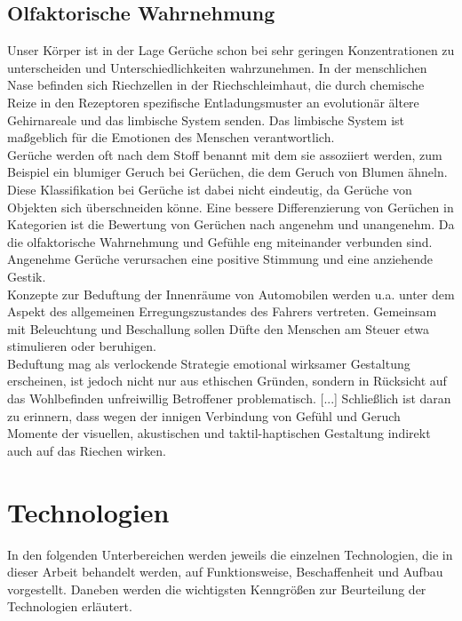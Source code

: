 \subsection{Olfaktorische Wahrnehmung}
Unser Körper ist in der Lage Gerüche schon bei sehr geringen Konzentrationen zu unterscheiden und Unterschiedlichkeiten wahrzunehmen. In der menschlichen Nase befinden sich Riechzellen in der Riechschleimhaut, die durch chemische Reize in den Rezeptoren spezifische Entladungsmuster an evolutionär ältere Gehirnareale und das limbische System senden. Das limbische System ist maßgeblich für die Emotionen des Menschen verantwortlich. \cite[Vgl. Seite 102]{Schonhammer.2013}\\
Gerüche werden oft nach dem Stoff benannt mit dem sie assoziiert werden, zum Beispiel ein blumiger Geruch bei Gerüchen, die dem Geruch von Blumen ähneln. Diese Klassifikation bei Gerüche ist dabei nicht eindeutig, da Gerüche von Objekten sich überschneiden könne. Eine bessere Differenzierung von Gerüchen in Kategorien ist die Bewertung von Gerüchen nach angenehm und unangenehm. Da die olfaktorische Wahrnehmung und Gefühle eng miteinander verbunden sind. Angenehme Gerüche verursachen eine positive Stimmung und eine anziehende Gestik. \cite[Vgl. Seite 105f]{Schonhammer.2013}\\
\glqq Konzepte zur Beduftung der Innenräume von Automobilen werden u.a. unter dem Aspekt des allgemeinen Erregungszustandes des Fahrers vertreten. Gemeinsam mit Beleuchtung und Beschallung sollen Düfte den Menschen am Steuer etwa stimulieren oder beruhigen.\grqq{} \cite[Seite 122f]{Schonhammer.2013}\\
\glqq Beduftung mag als verlockende Strategie emotional wirksamer Gestaltung erscheinen, ist jedoch nicht nur aus ethischen Gründen, sondern in Rücksicht auf das Wohlbefinden unfreiwillig Betroffener problematisch. [...] Schließlich ist daran zu erinnern, dass wegen der innigen Verbindung von Gefühl und Geruch Momente der visuellen, akustischen und taktil-haptischen Gestaltung indirekt auch auf das Riechen wirken. \grqq{} \cite[Seite 123]{Schonhammer.2013}
\section{Technologien}
In den folgenden Unterbereichen werden jeweils die einzelnen Technologien, die in dieser Arbeit behandelt werden, auf Funktionsweise, Beschaffenheit und Aufbau vorgestellt. Daneben werden die wichtigsten Kenngrößen zur Beurteilung der Technologien erläutert.
